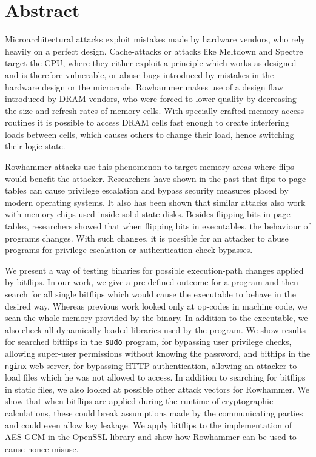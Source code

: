 
{}
\chapter*{Abstract}
\label{cha:abstract}

Microarchitectural attacks exploit mistakes made by hardware vendors, who rely
heavily on a perfect design. Cache-attacks or attacks like Meltdown and Spectre
target the CPU, where they either exploit a principle which works as designed
and is therefore vulnerable, or abuse bugs introduced by mistakes in the
hardware design or the microcode. Rowhammer makes use of a design flaw
introduced by DRAM vendors, who were forced to lower quality by decreasing the
size and refresh rates of memory cells. With specially crafted memory access
routines it is possible to access DRAM cells fast enough to create interfering
loads between cells, which causes others to change their load, hence switching
their logic state.

Rowhammer attacks use this phenomenon to target memory areas where flips would
benefit the attacker. Researchers have shown in the past that flips to
page tables can cause privilege escalation and bypass security measures placed
by modern operating systems. It also has been shown that similar attacks also
work with memory chips used inside solid-state disks. Besides flipping bits in
page tables, researchers showed that when flipping bits in executables, the
behaviour of programs changes. With such changes, it is possible for an attacker
to abuse programs for privilege escalation or authentication-check bypasses.

We present a way of testing binaries for possible execution-path changes applied
by bitflips. In our work, we give a pre-defined outcome for a program and then
search for all single bitflips which would cause the executable to behave in the
desired way. Whereas previous work looked only at op-codes in machine
code, we scan the whole memory provided by the binary. In addition to the
executable, we also check all dynamically loaded libraries used by the program.
We show results for searched bitflips in the \texttt{sudo} program, for
bypassing user privilege checks, allowing super-user permissions without knowing
the password, and bitflips in the \texttt{nginx} web server, for bypassing HTTP
authentication, allowing an attacker to load files which he was not allowed to
access. In addition to searching for bitflips in static files, we also looked at
possible other attack vectors for Rowhammer. We show that when bitflips are
applied during the runtime of cryptographic calculations, these could break
assumptions made by the communicating parties and could even allow key leakage.
We apply bitflips to the implementation of AES-GCM in the OpenSSL library and
show how Rowhammer can be used to cause nonce-misuse.


